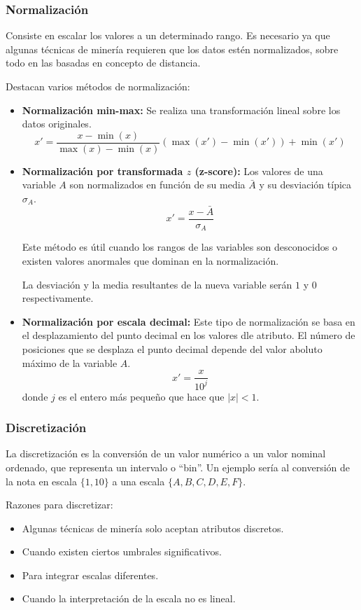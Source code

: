 \documentclass[12pt, letterpaper]{article}
\begin{document}
\subsubsection{Normalización}
Consiste en escalar los valores a un determinado rango. Es necesario ya que algunas técnicas de minería requieren que los datos estén normalizados, sobre todo en las basadas en concepto de distancia.

Destacan varios métodos de normalización:
\begin{itemize}
    \item \textbf{Normalización min-max:} Se realiza una transformación lineal sobre los datos originales.
    \[
        x' = \frac{x - \min(x)}{\max(x) - \min(x)}(\max(x') - \min(x')) + \min(x')
    \]
    \item \textbf{Normalización por transformada $z$ (z-score):} Los valores de una variable $A$ son normalizados en función de su media $\bar{A}$ y su desviación típica $\sigma_A$.
    \[
        x' = \frac{x - \bar{A}}{\sigma_A}
    \]

    Este método es útil cuando los rangos de las variables son desconocidos o existen valores anormales que dominan en la normalización.

    La desviación y la media resultantes de la nueva variable serán $1$ y $0$ respectivamente.

    \item \textbf{Normalización por escala decimal:} Este tipo de normalización se basa en el desplazamiento del punto decimal en los valores dle atributo. El número de posiciones que se desplaza el punto decimal depende del valor aboluto máximo de la variable $A$.
    \[
        x' = \frac{x}{10^j}
    \]
    donde $j$ es el entero más pequeño que hace que $\lvert x \rvert < 1$.

\end{itemize}

\subsubsection{Discretización}
La discretización es la conversión de un valor numérico a un valor nominal ordenado, que representa un intervalo o ``bin''. Un ejemplo sería al conversión de la nota en escala $\{1,10\}$ a una escala $\{A,B,C,D,E,F\}$.

Razones para discretizar:
\begin{itemize}
    \item Algunas técnicas de minería solo aceptan atributos discretos.
    \item Cuando existen ciertos umbrales significativos.
    \item Para integrar escalas diferentes.
    \item Cuando la interpretación de la escala no es lineal.
\end{itemize}
\end{document}
